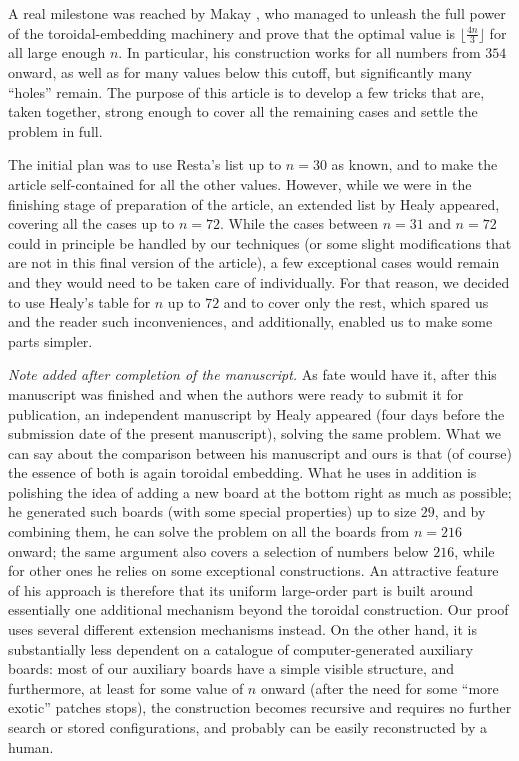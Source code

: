 \documentclass[10pt,a4paper]{article}
\theoremstyle{definition}
\begin{document}
A real milestone was reached by Makay \cite{makay}, who managed to unleash the full power of the toroidal-embedding machinery and prove that the optimal value is $\lfloor\frac{4n}3\rfloor$ for all large enough $n$. In particular, his construction works for all numbers from $354$ onward, as well as for many values below this cutoff, but significantly many ``holes'' remain. The purpose of this article is to develop a few tricks that are, taken together, strong enough to cover all the remaining cases and settle the problem in full. 

The initial plan was to use Resta's list \cite{resta} up to $n=30$ as known, and to make the article self-contained for all the other values. However, while we were in the finishing stage of preparation of the article, an extended list by Healy \cite{healy} appeared, covering all the cases up to $n=72$. While the cases between $n=31$ and $n=72$ could in principle be handled by our techniques (or some slight modifications that are not in this final version of the article), a few exceptional cases would remain and they would need to be taken care of individually. For that reason, we decided to use Healy's table for $n$ up to $72$ and to cover only the rest, which spared us and the reader such inconveniences, and additionally, enabled us to make some parts simpler.

\emph{Note added after completion of the manuscript.}
As fate would have it, after this manuscript was finished and when the authors were ready to submit it for publication, an independent manuscript by Healy \cite{healyproof} appeared (four days before the submission date of the present manuscript), solving the same problem. What we can say about the comparison between his manuscript and ours is that (of course) the essence of both is again toroidal embedding. What he uses in addition is polishing the idea of adding a new board at the bottom right as much as possible; he generated such boards (with some special properties) up to size $29$, and by combining them, he can solve the problem on all the boards from $n=216$ onward; the same argument also covers a selection of numbers below $216$, while for other ones he relies on some exceptional constructions. An attractive feature of his approach is therefore that its uniform large-order part is built around essentially one additional mechanism beyond the toroidal construction. Our proof uses several different extension mechanisms instead. On the other hand, it is substantially less dependent on a catalogue of computer-generated auxiliary boards: most of our auxiliary boards have a simple visible structure, and furthermore, at least for some value of $n$ onward (after the need for some ``more exotic'' patches stops), the construction becomes recursive and requires no further search or stored configurations, and probably can be easily reconstructed by a human.
\end{document}

